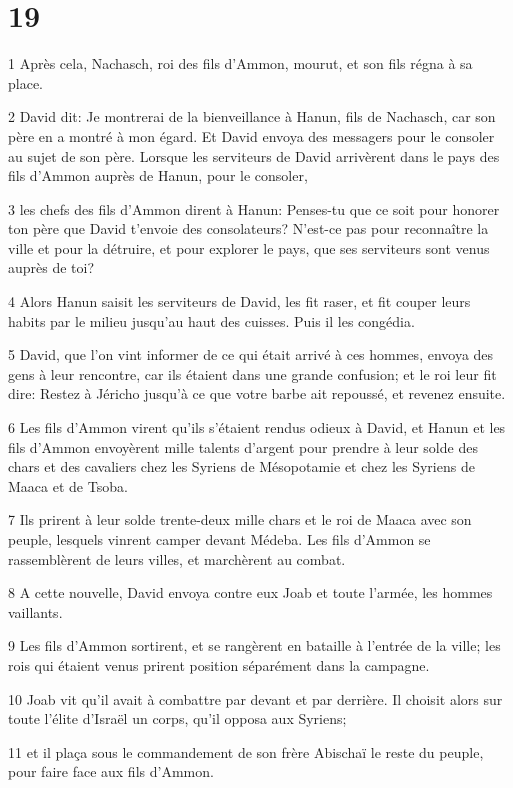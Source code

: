 \chapter{19}

\par 1 Après cela, Nachasch, roi des fils d'Ammon, mourut, et son fils régna à sa place.
\par 2 David dit: Je montrerai de la bienveillance à Hanun, fils de Nachasch, car son père en a montré à mon égard. Et David envoya des messagers pour le consoler au sujet de son père. Lorsque les serviteurs de David arrivèrent dans le pays des fils d'Ammon auprès de Hanun, pour le consoler,
\par 3 les chefs des fils d'Ammon dirent à Hanun: Penses-tu que ce soit pour honorer ton père que David t'envoie des consolateurs? N'est-ce pas pour reconnaître la ville et pour la détruire, et pour explorer le pays, que ses serviteurs sont venus auprès de toi?
\par 4 Alors Hanun saisit les serviteurs de David, les fit raser, et fit couper leurs habits par le milieu jusqu'au haut des cuisses. Puis il les congédia.
\par 5 David, que l'on vint informer de ce qui était arrivé à ces hommes, envoya des gens à leur rencontre, car ils étaient dans une grande confusion; et le roi leur fit dire: Restez à Jéricho jusqu'à ce que votre barbe ait repoussé, et revenez ensuite.
\par 6 Les fils d'Ammon virent qu'ils s'étaient rendus odieux à David, et Hanun et les fils d'Ammon envoyèrent mille talents d'argent pour prendre à leur solde des chars et des cavaliers chez les Syriens de Mésopotamie et chez les Syriens de Maaca et de Tsoba.
\par 7 Ils prirent à leur solde trente-deux mille chars et le roi de Maaca avec son peuple, lesquels vinrent camper devant Médeba. Les fils d'Ammon se rassemblèrent de leurs villes, et marchèrent au combat.
\par 8 A cette nouvelle, David envoya contre eux Joab et toute l'armée, les hommes vaillants.
\par 9 Les fils d'Ammon sortirent, et se rangèrent en bataille à l'entrée de la ville; les rois qui étaient venus prirent position séparément dans la campagne.
\par 10 Joab vit qu'il avait à combattre par devant et par derrière. Il choisit alors sur toute l'élite d'Israël un corps, qu'il opposa aux Syriens;
\par 11 et il plaça sous le commandement de son frère Abischaï le reste du peuple, pour faire face aux fils d'Ammon.

